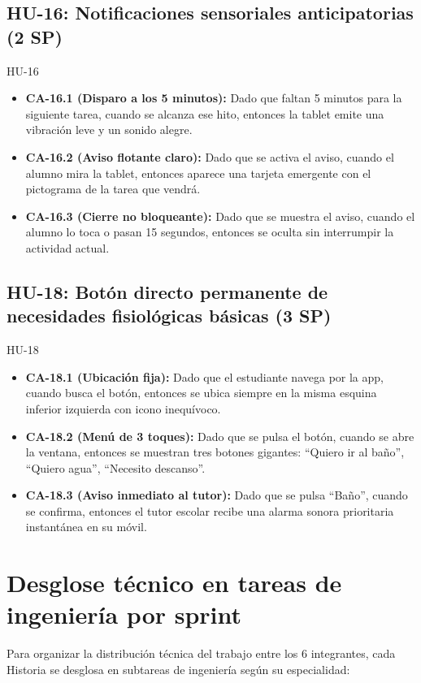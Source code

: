 \documentclass[11pt,a4paper]{article}
\newcommand{\ca}[2]{\item \textbf{#1:} #2}
\begin{document}
\subsection{HU-16: Notificaciones sensoriales anticipatorias (2 SP)}
\begin{criterios}{HU-16}
\begin{itemize}
\ca{CA-16.1 (Disparo a los 5 minutos)}{Dado que faltan 5 minutos para la siguiente tarea, cuando se alcanza ese hito, entonces la tablet emite una vibración leve y un sonido alegre.}
\ca{CA-16.2 (Aviso flotante claro)}{Dado que se activa el aviso, cuando el alumno mira la tablet, entonces aparece una tarjeta emergente con el pictograma de la tarea que vendrá.}
\ca{CA-16.3 (Cierre no bloqueante)}{Dado que se muestra el aviso, cuando el alumno lo toca o pasan 15 segundos, entonces se oculta sin interrumpir la actividad actual.}
\end{itemize}
\end{criterios}

\subsection{HU-18: Botón directo permanente de necesidades fisiológicas básicas (3 SP)}
\begin{criterios}{HU-18}
\begin{itemize}
\ca{CA-18.1 (Ubicación fija)}{Dado que el estudiante navega por la app, cuando busca el botón, entonces se ubica siempre en la misma esquina inferior izquierda con icono inequívoco.}
\ca{CA-18.2 (Menú de 3 toques)}{Dado que se pulsa el botón, cuando se abre la ventana, entonces se muestran tres botones gigantes: ``Quiero ir al baño'', ``Quiero agua'', ``Necesito descanso''.}
\ca{CA-18.3 (Aviso inmediato al tutor)}{Dado que se pulsa ``Baño'', cuando se confirma, entonces el tutor escolar recibe una alarma sonora prioritaria instantánea en su móvil.}
\end{itemize}
\end{criterios}

\section{Desglose técnico en tareas de ingeniería por sprint}
Para organizar la distribución técnica del trabajo entre los 6 integrantes, cada Historia se desglosa en subtareas de ingeniería según su especialidad:
\end{document}
